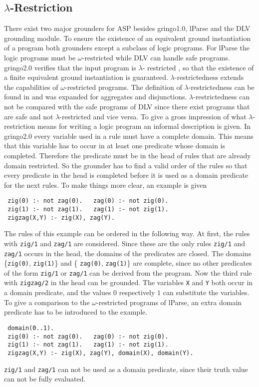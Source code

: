 \documentclass[a4paper,10pt]{article}
\begin{document}
\subsection{$\lambda$-Restriction}
\label{domainrestricted}
There exist two major grounders for ASP besides gringo1.0, lParse \cite{lparseManual} and  the DLV grounding module\cite{DLV}.
To ensure the existence of an equivalent ground instantiation of a program both grounders except a subclass of logic programs. For lParse the logic programs must be $\omega$-restricted\cite{omega} while DLV can handle safe programs\cite{safe}.
gringo2.0 verifies that the input program is $\lambda$-
restricted \cite{gringopaper}, so that the existence of a finite equivalent ground instantiation is guaranteed. 
$\lambda$-restrictedness extends the capabilities of $\omega$-restricted programs. The definition of $\lambda$-restrictedness can be found in \cite{gringopaper} and was expanded for aggregates and disjunctions.
$\lambda$-restrictedness can not be compared with the safe programs of DLV since there exist programs that are safe and not $\lambda$-restricted and vice versa.
\newline
To give a gross impression of what $\lambda$-restriction means for writing a logic program an informal description is given.
In gringo2.0 every variable used in a rule must have a complete domain. This means that this variable has to occur in at least one predicate whose domain is completed. Therefore the predicate must be in the head of rules that are already domain restricted. So the grounder has to find a valid order of the rules so that every predicate in the head is completed before it is used as a domain predicate for the next rules.
To make things more clear, an example is given
\begin{verbatim}
 zig(0) :- not zag(0).   zag(0) :- not zig(0).
 zig(1) :- not zag(1).   zag(1) :- not zig(1).
 zigzag(X,Y) :- zig(X), zag(Y).
\end{verbatim}
The rules of this example can be ordered in the following way.
At first, the rules with \texttt{zig/1} and \texttt{zag/1} are considered.
Since these are the only rules \texttt{zig/1} and \texttt{zag/1} occurs in the head, the domains of the predicates are closed. The domains \{\texttt{zig(0)}, \texttt{zig(1)}\} and \{ \texttt{zag(0)}, \texttt{zag(1)}\} are complete, since no other predicates of the form \texttt{zig/1} or \texttt{zag/1} can be derived from the program.
Now the third rule with \texttt{zigzag/2} in the head can be grounded. The variables \texttt{X} and \texttt{Y} both occur in a domain predicate, and the values $0$ respectively $1$ can substitute the variables.
\newline
To give a comparison to the $\omega$-restricted programs of lParse, an extra domain predicate has to be introduced to the example.
\begin{verbatim}
 domain(0..1).
 zig(0) :- not zag(0).   zag(0) :- not zig(0).
 zig(1) :- not zag(1).   zag(1) :- not zig(1).
 zigzag(X,Y) :- zig(X), zag(Y), domain(X), domain(Y).
\end{verbatim}
\texttt{zig/1} and \texttt{zag/1} can not be used as a domain predicate, since their truth value can not be fully evaluated.
\end{document}
